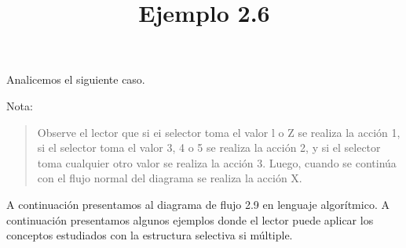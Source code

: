 \documentclass[11pt]{amsart}
\title{Ejemplo 2.6}
\begin{document}
\maketitle
\noindent Analicemos el siguiente caso.

\noindent Nota: 
\begin{quotation}
\noindent Observe el lector que si ei selector toma el valor l o Z se realiza la acción 1, si el selector toma el valor 3, 4 o 5 se realiza la acción 2, y si el selector toma cualquier otro valor se realiza la acción 3. Luego, cuando se continúa con el flujo normal del diagrama se realiza la acción X.
\end{quotation}

\noindent A continuación presentamos al diagrama de flujo 2.9 en lenguaje algorítmico. A continuación presentamos algunos ejemplos donde el lector puede aplicar los conceptos estudiados con la estructura selectiva si múltiple.
\end{document}
